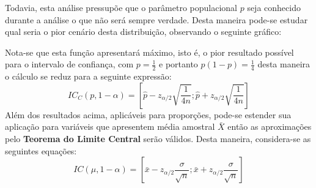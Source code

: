 \documentclass{article}
\begin{document}
            Todavia, esta análise pressupõe que o parâmetro populacional $p$ seja conhecido durante a análise o que não será sempre verdade. Desta maneira pode-se estudar qual seria o pior cenário desta distribuição, observando o seguinte gráfico:
                \begin{figure}[H]
                    \centering
                \end{figure}\noindent
            Nota-se que esta função apresentará máximo, isto é, o pior resultado possível para o intervalo de confiança, com $p = \frac{1}{2}$ e portanto $p(1-p) = \frac{1}{4}$ desta maneira o cálculo se reduz para a seguinte expressão:
                \begin{equation}
                    \boxed{
                        IC_{C} (p, 1-\alpha) = 
                        \left[
                            \hat{p} - z_{\alpha/2}\sqrt{\frac{1}{4n}};
                            \hat{p} + z_{\alpha/2}\sqrt{\frac{1}{4n}}
                        \right]
                    }
                \end{equation}
            Além dos resultados acima, aplicáveis para proporções, pode-se estender sua aplicação para variáveis que apresentem média amostral $\bar{X}$ então as aproximações pelo \textbf{Teorema do Limite Central} serão válidos. Desta maneira, considera-se as seguintes equações:
                \begin{equation}
                    \boxed{
                        IC (\mu, 1-\alpha) = 
                        \left[
                            \bar{x} - z_{\alpha/2}\frac{\sigma}{\sqrt{n}};
                            \bar{x} + z_{\alpha/2}\frac{\sigma}{\sqrt{n}}
                        \right]
                    }
                \end{equation}
\end{document}
